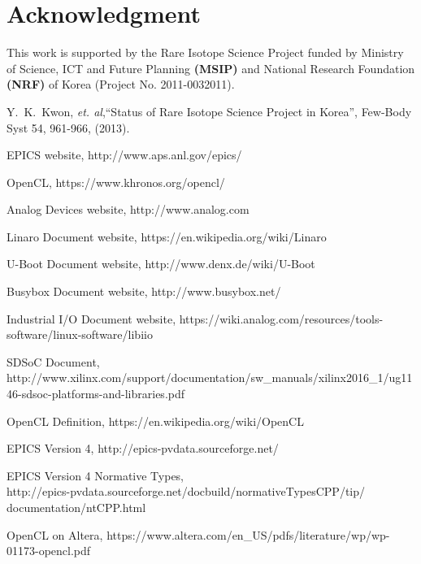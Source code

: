 \documentclass[journal]{IEEEtran}
\begin{document}
\section*{Acknowledgment}
This work is supported by the Rare Isotope Science Project funded by Ministry of Science, ICT and Future Planning \textbf{(MSIP)} and National Research Foundation \textbf{(NRF)} of Korea (Project No. 2011-0032011).



%
%
%
\begin{thebibliography}{3}

 Y.~K.~Kwon, {\it et. al},``Status of Rare Isotope Science Project in Korea'',
Few-Body Syst 54, 961-966, (2013).

EPICS website, http://www.aps.anl.gov/epics/

OpenCL, https://www.khronos.org/opencl/

Analog Devices website, http://www.analog.com

Linaro Document website, https://en.wikipedia.org/wiki/Linaro

U-Boot Document website, http://www.denx.de/wiki/U-Boot

Busybox Document website, http://www.busybox.net/


Industrial I/O Document website, https://wiki.analog.com/resources/tools-software/linux-software/libiio

SDSoC Document,\\ http://www.xilinx.com/support/documentation/sw\_manuals/xilinx2016\_1/ug1146-sdsoc-platforms-and-libraries.pdf

OpenCL Definition, https://en.wikipedia.org/wiki/OpenCL

EPICS Version 4, http://epics-pvdata.sourceforge.net/

EPICS Version 4 Normative Types,\\ http://epics-pvdata.sourceforge.net/docbuild/normativeTypesCPP/tip/\\documentation/ntCPP.html

OpenCL on Altera, https://www.altera.com/en\_US/pdfs/literature/wp/wp-01173-opencl.pdf

\end{thebibliography}

\end{document}

